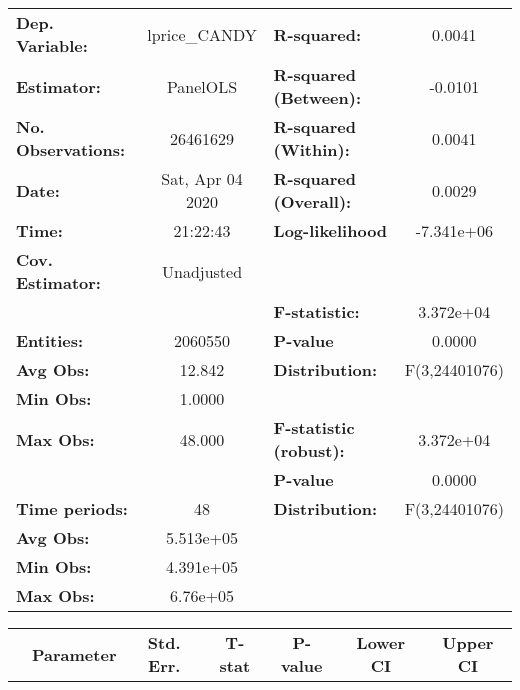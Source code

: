 \documentclass{report}
\begin{document}
\begin{center}
\begin{tabular}{lclc}
\toprule
\textbf{Dep. Variable:}    &   lprice\_CANDY    & \textbf{  R-squared:         }   &      0.0041      \\
\textbf{Estimator:}        &      PanelOLS      & \textbf{  R-squared (Between):}  &     -0.0101      \\
\textbf{No. Observations:} &      26461629      & \textbf{  R-squared (Within):}   &      0.0041      \\
\textbf{Date:}             &  Sat, Apr 04 2020  & \textbf{  R-squared (Overall):}  &      0.0029      \\
\textbf{Time:}             &      21:22:43      & \textbf{  Log-likelihood     }   &    -7.341e+06    \\
\textbf{Cov. Estimator:}   &     Unadjusted     & \textbf{                     }   &                  \\
\textbf{}                  &                    & \textbf{  F-statistic:       }   &    3.372e+04     \\
\textbf{Entities:}         &      2060550       & \textbf{  P-value            }   &      0.0000      \\
\textbf{Avg Obs:}          &       12.842       & \textbf{  Distribution:      }   &  F(3,24401076)   \\
\textbf{Min Obs:}          &       1.0000       & \textbf{                     }   &                  \\
\textbf{Max Obs:}          &       48.000       & \textbf{  F-statistic (robust):} &    3.372e+04     \\
\textbf{}                  &                    & \textbf{  P-value            }   &      0.0000      \\
\textbf{Time periods:}     &         48         & \textbf{  Distribution:      }   &  F(3,24401076)   \\
\textbf{Avg Obs:}          &     5.513e+05      & \textbf{                     }   &                  \\
\textbf{Min Obs:}          &     4.391e+05      & \textbf{                     }   &                  \\
\textbf{Max Obs:}          &      6.76e+05      & \textbf{                     }   &                  \\
\bottomrule
\end{tabular}
\begin{tabular}{lcccccc}
                           & \textbf{Parameter} & \textbf{Std. Err.} & \textbf{T-stat} & \textbf{P-value} & \textbf{Lower CI} & \textbf{Upper CI}  \\

\end{tabular}
\end{center}
\end{document}
